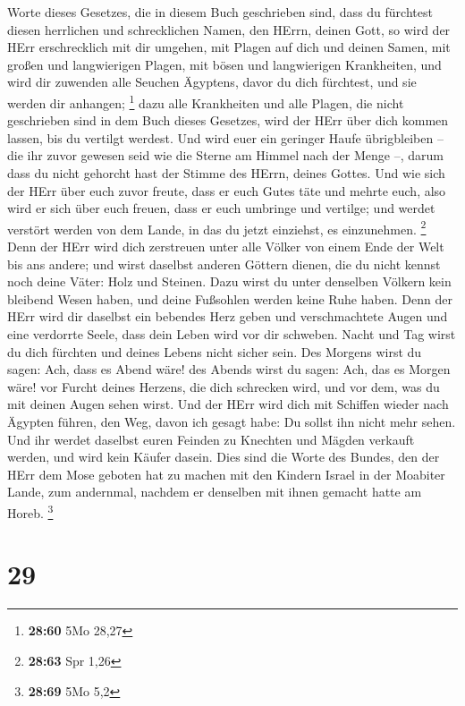 Worte dieses Gesetzes, die in diesem Buch geschrieben sind, dass du
fürchtest diesen herrlichen und schrecklichen Namen, den HErrn, deinen
Gott,  so wird der HErr erschrecklich mit dir umgehen, mit
Plagen auf dich und deinen Samen, mit großen und langwierigen Plagen,
mit bösen und langwierigen Krankheiten,  und wird dir
zuwenden alle Seuchen Ägyptens, davor du dich fürchtest, und sie werden
dir anhangen; \footnote{\textbf{28:60} 5Mo 28,27}  dazu
alle Krankheiten und alle Plagen, die nicht geschrieben sind in dem Buch
dieses Gesetzes, wird der HErr über dich kommen lassen, bis du vertilgt
werdest.  Und wird euer ein geringer Haufe übrigbleiben --
die ihr zuvor gewesen seid wie die Sterne am Himmel nach der Menge --,
darum dass du nicht gehorcht hast der Stimme des HErrn, deines Gottes.
 Und wie sich der HErr über euch zuvor freute, dass er euch
Gutes täte und mehrte euch, also wird er sich über euch freuen, dass er
euch umbringe und vertilge; und werdet verstört werden von dem Lande, in
das du jetzt einziehst, es einzunehmen. \footnote{\textbf{28:63} Spr
  1,26}  Denn der HErr wird dich zerstreuen unter alle
Völker von einem Ende der Welt bis ans andere; und wirst daselbst
anderen Göttern dienen, die du nicht kennst noch deine Väter: Holz und
Steinen.  Dazu wirst du unter denselben Völkern kein
bleibend Wesen haben, und deine Fußsohlen werden keine Ruhe haben. Denn
der HErr wird dir daselbst ein bebendes Herz geben und verschmachtete
Augen und eine verdorrte Seele,  dass dein Leben wird vor
dir schweben. Nacht und Tag wirst du dich fürchten und deines Lebens
nicht sicher sein.  Des Morgens wirst du sagen: Ach, dass
es Abend wäre! des Abends wirst du sagen: Ach, das es Morgen wäre! vor
Furcht deines Herzens, die dich schrecken wird, und vor dem, was du mit
deinen Augen sehen wirst.  Und der HErr wird dich mit
Schiffen wieder nach Ägypten führen, den Weg, davon ich gesagt habe: Du
sollst ihn nicht mehr sehen. Und ihr werdet daselbst euren Feinden zu
Knechten und Mägden verkauft werden, und wird kein Käufer dasein.
 Dies sind die Worte des Bundes, den der HErr dem Mose
geboten hat zu machen mit den Kindern Israel in der Moabiter Lande, zum
andernmal, nachdem er denselben mit ihnen gemacht hatte am Horeb.
\footnote{\textbf{28:69} 5Mo 5,2}

\hypertarget{section-8}{%
\section{29}\label{section-8}}

